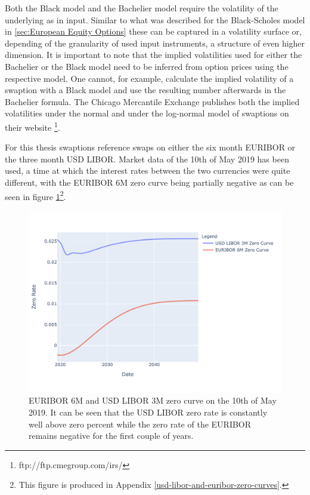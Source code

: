\documentclass[../Thesis_AHoecherl.tex]{subfiles}
\begin{document}
    Both the Black model and the Bachelier model require the volatility of the underlying as in input. Similar to what was described for the Black-Scholes model in \ref{sec:European Equity Options} these can be captured in a volatility surface or, depending of the granularity of used input instruments, a structure of even higher dimension.
    It is important to note that the implied volatilities used for either the Bachelier or the Black model need to be inferred from option prices using the respective model.
    One cannot, for example, calculate the implied volatility of a swaption with a Black model and use the resulting number afterwards in the Bachelier formula.
    The Chicago Mercantile Exchange publishes both the implied volatilities under the normal and under the log-normal model of swaptions on their website
    \footnote{ftp://ftp.cmegroup.com/irs/}.

    For this thesis swaptions reference swaps on either the six month \gls{EURIBOR} or the three month USD \gls{LIBOR}.
    Market data of the 10th of May 2019 has been used, a time at which the interest rates between the two currencies were quite different, with the \gls{EURIBOR} 6M zero curve being partially negative as can be seen in figure \ref{fig:EURIBOR and LIBOR forward curve}\footnote{This figure is produced in Appendix \ref{usd-libor-and-euribor-zero-curves}.}.

    \begin{figure}
        \centering
        \includegraphics{Graphics/EURIBOR_and_LIBOR_curve.pdf}
        \caption[EURIBOR 6M and USD LIBOR 3M zero curve]{\gls{EURIBOR} 6M and USD \gls{LIBOR} 3M zero curve on the 10th of May 2019. It can be seen that the USD \gls{LIBOR} zero rate is constantly well above zero percent while the zero rate of the \gls{EURIBOR} remains negative for the first couple of years.}
        \label{fig:EURIBOR and LIBOR forward curve}
    \end{figure}
\end{document}

